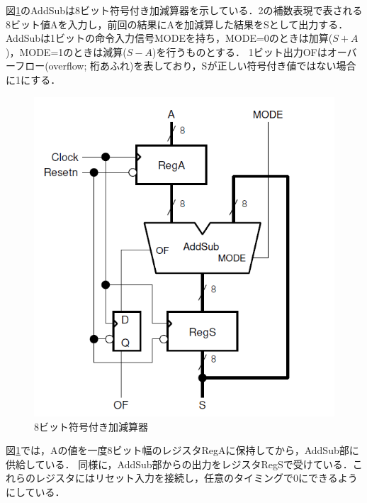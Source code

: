 \documentclass{jlreq}
\numberwithin{equation}{section}
\begin{document}
図\ref{fig:8bit_signed_addsub}のAddSubは8ビット符号付き加減算器を示している．2の補数表現で表される8ビット値Aを入力し，前回の結果にAを加減算した結果をSとして出力する．
AddSubは1ビットの命令入力信号MODEを持ち，MODE=0のときは加算($S+A$)，MODE=1のときは減算($S-A$)を行うものとする．
1ビット出力OFはオーバーフロー(overflow; 桁あふれ)を表しており，Sが正しい符号付き値ではない場合に1にする．
\begin{figure}[H]
  \centering
  \includegraphics{assets/8bit_signed_adder_subtractor.png}
  \caption{8ビット符号付き加減算器}
  \label{fig:8bit_signed_addsub}
\end{figure}

図\ref{fig:8bit_signed_addsub}では，Aの値を一度8ビット幅のレジスタRegAに保持してから，AddSub部に供給している．
同様に，AddSub部からの出力をレジスタRegSで受けている．これらのレジスタにはリセット入力を接続し，任意のタイミングで0にできるようにしている．
\end{document}
